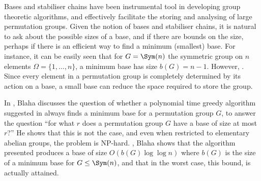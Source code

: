 Bases and stabiliser chains have been  instrumental tool in developing group theoretic algorithms, and effectively facilitate the storing and analysing of large permutation groups. Given the notion of bases and stabiliser chains, it is natural to ask about the possible sizes of a base, and if there are bounds on the size, perhaps if there is an efficient way to find a minimum (smallest) base. For instance, it can be easily seen that for $G = \Sym(n)$ the symmetric group on $n$ elements $\Omega = \{1,\dotsc,n\}$, a minimum base has size $b(G) = n-1$. However, . Since every element in a permutation group is completely determined by its action on a base, a small base can reduce the space required to store the group.

In \cite{blaha1992}, Blaha discusses the question of whether a polynomial time greedy algorithm suggested in \cite{brown1989} always finds a minimum base for a permutation group $G$, to answer the question ``for what $r$ does a permutation group $G$ have a base of size at most $r$?'' He shows that this is not the case, and even when restricted to elementary abelian groups, the problem is NP-hard. , Blaha shows that the algorithm presented produces a base of size $O(b(G)\log\log n)$ where $b(G)$ is the size of a minimum base for $G \leq \Sym(n)$, and that in the worst case, this bound,  is actually attained. 

